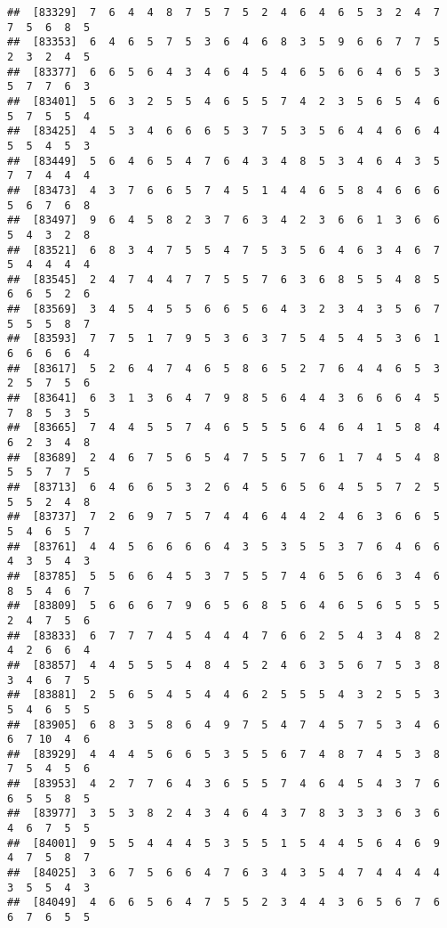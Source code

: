 \documentclass[
]{book}
\begin{document}
\begin{verbatim}
##  [83329]  7  6  4  4  8  7  5  7  5  2  4  6  4  6  5  3  2  4  7  7  5  6  8  5
##  [83353]  6  4  6  5  7  5  3  6  4  6  8  3  5  9  6  6  7  7  5  2  3  2  4  5
##  [83377]  6  6  5  6  4  3  4  6  4  5  4  6  5  6  6  4  6  5  3  5  7  7  6  3
##  [83401]  5  6  3  2  5  5  4  6  5  5  7  4  2  3  5  6  5  4  6  5  7  5  5  4
##  [83425]  4  5  3  4  6  6  6  5  3  7  5  3  5  6  4  4  6  6  4  5  5  4  5  3
##  [83449]  5  6  4  6  5  4  7  6  4  3  4  8  5  3  4  6  4  3  5  7  7  4  4  4
##  [83473]  4  3  7  6  6  5  7  4  5  1  4  4  6  5  8  4  6  6  6  5  6  7  6  8
##  [83497]  9  6  4  5  8  2  3  7  6  3  4  2  3  6  6  1  3  6  6  5  4  3  2  8
##  [83521]  6  8  3  4  7  5  5  4  7  5  3  5  6  4  6  3  4  6  7  5  4  4  4  4
##  [83545]  2  4  7  4  4  7  7  5  5  7  6  3  6  8  5  5  4  8  5  6  6  5  2  6
##  [83569]  3  4  5  4  5  5  6  6  5  6  4  3  2  3  4  3  5  6  7  5  5  5  8  7
##  [83593]  7  7  5  1  7  9  5  3  6  3  7  5  4  5  4  5  3  6  1  6  6  6  6  4
##  [83617]  5  2  6  4  7  4  6  5  8  6  5  2  7  6  4  4  6  5  3  2  5  7  5  6
##  [83641]  6  3  1  3  6  4  7  9  8  5  6  4  4  3  6  6  6  4  5  7  8  5  3  5
##  [83665]  7  4  4  5  5  7  4  6  5  5  5  6  4  6  4  1  5  8  4  6  2  3  4  8
##  [83689]  2  4  6  7  5  6  5  4  7  5  5  7  6  1  7  4  5  4  8  5  5  7  7  5
##  [83713]  6  4  6  6  5  3  2  6  4  5  6  5  6  4  5  5  7  2  5  5  5  2  4  8
##  [83737]  7  2  6  9  7  5  7  4  4  6  4  4  2  4  6  3  6  6  5  5  4  6  5  7
##  [83761]  4  4  5  6  6  6  6  4  3  5  3  5  5  3  7  6  4  6  6  4  3  5  4  3
##  [83785]  5  5  6  6  4  5  3  7  5  5  7  4  6  5  6  6  3  4  6  8  5  4  6  7
##  [83809]  5  6  6  6  7  9  6  5  6  8  5  6  4  6  5  6  5  5  5  2  4  7  5  6
##  [83833]  6  7  7  7  4  5  4  4  4  7  6  6  2  5  4  3  4  8  2  4  2  6  6  4
##  [83857]  4  4  5  5  5  4  8  4  5  2  4  6  3  5  6  7  5  3  8  3  4  6  7  5
##  [83881]  2  5  6  5  4  5  4  4  6  2  5  5  5  4  3  2  5  5  3  5  4  6  5  5
##  [83905]  6  8  3  5  8  6  4  9  7  5  4  7  4  5  7  5  3  4  6  6  7 10  4  6
##  [83929]  4  4  4  5  6  6  5  3  5  5  6  7  4  8  7  4  5  3  8  7  5  4  5  6
##  [83953]  4  2  7  7  6  4  3  6  5  5  7  4  6  4  5  4  3  7  6  6  5  5  8  5
##  [83977]  3  5  3  8  2  4  3  4  6  4  3  7  8  3  3  3  6  3  6  4  6  7  5  5
##  [84001]  9  5  5  4  4  4  5  3  5  5  1  5  4  4  5  6  4  6  9  4  7  5  8  7
##  [84025]  3  6  7  5  6  6  4  7  6  3  4  3  5  4  7  4  4  4  4  3  5  5  4  3
##  [84049]  4  6  6  5  6  4  7  5  5  2  3  4  4  3  6  5  6  7  6  6  7  6  5  5

\end{verbatim}
\end{document}
